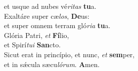 \oddverse et usque ad nubes vé\textit{ri}\textit{tas} \textbf{tu}a.\\
\evenverse Exaltáre super cæ\textit{los}, \textbf{De}us:~\*\\
\evenverse et super omnem terram gló\textit{ri}\textit{a} \textbf{tu}a.\\
\oddverse Glória Patri, \textit{et} \textbf{Fí}lio,~\*\\
\oddverse et Spirí\textit{tu}\textit{i} \textbf{San}cto.\\
\evenverse Sicut erat in princípio, et nunc, \textit{et} \textbf{sem}per,~\*\\
\evenverse et in sǽcula sæcu\textit{ló}\textit{rum}. \textbf{A}men.\\
